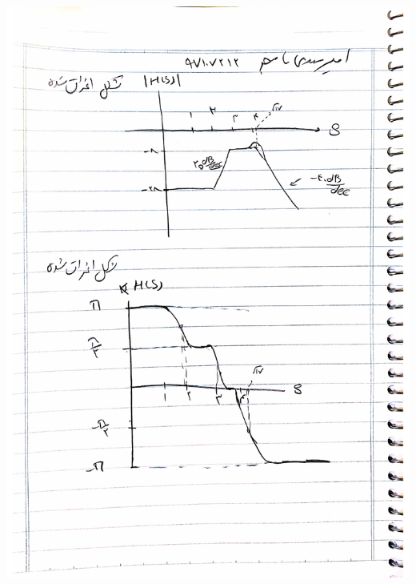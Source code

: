 \documentclass[12pt]{article}
\begin{document}
\begin{enumerate}
	\includegraphics[page = 1 , width=1.0\textwidth]{images/5.pdf}
\end{enumerate}	
	
\end{document}
